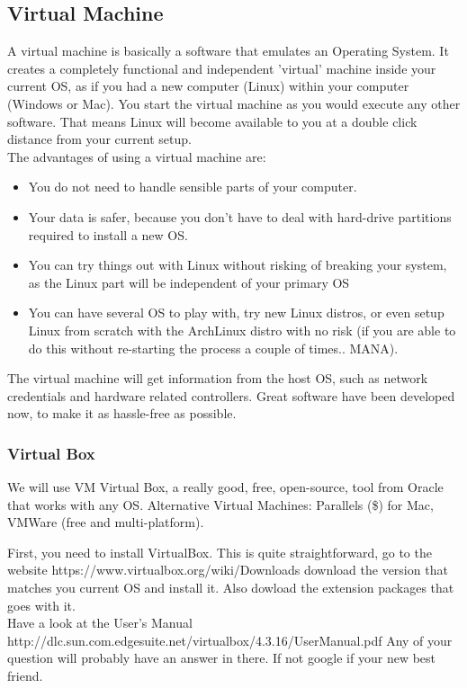 \documentclass[a4paper]{article}
\begin{document}
\subsection{Virtual Machine}
A virtual machine is basically a software that emulates an Operating System. It creates a completely functional and independent 'virtual' machine inside your current OS, as if you had a new computer (Linux) within your computer (Windows or Mac). You start the virtual machine as you would execute any other software. That means Linux will become available to you at a double click distance from your current setup. \\
The advantages of using a virtual machine are:
\begin{itemize}
\item You do not need to handle sensible parts of your computer.
\item Your data is safer, because you don't have to deal with hard-drive partitions required to install a new OS.
\item You can try things out with Linux without risking of breaking your system, as the Linux part will be independent of your primary OS
\item You can have several OS to play with, try new Linux distros, or even setup Linux from scratch with the ArchLinux distro with no risk (if you are able to do this without re-starting the process a couple of times.. MANA).
\end{itemize}

The virtual machine will get information from the host OS, such as network credentials and hardware related controllers. Great software have been developed now, to make it as hassle-free as possible.\\

\subsubsection{Virtual Box}
We will use VM Virtual Box, a really good, free, open-source, tool from Oracle that works with any OS. Alternative Virtual Machines: Parallels (\$) for Mac, VMWare (free and multi-platform).

First, you need to install VirtualBox. This is quite straightforward, go to the website https://www.virtualbox.org/wiki/Downloads download the version that matches you current OS and install it. Also dowload the extension packages that goes with it.\\
Have a look at the User's Manual http://dlc.sun.com.edgesuite.net/virtualbox/4.3.16/UserManual.pdf Any of your question will probably have an answer in there. If not google if your new best friend.\\
\end{document}
